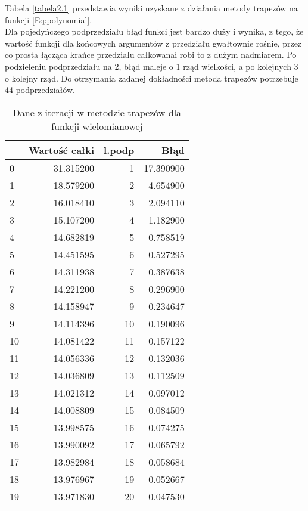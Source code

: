 \documentclass[12pt,twoside]{article}
\begin{document}
Tabela \eqref{tabela2.1} przedstawia wyniki uzyskane z działania metody trapezów na funkcji \eqref{Eq:polynomial}.\\
Dla pojedyńczego podprzedziału błąd funkci jest bardzo duży i wynika, z tego, że wartość funkcji dla końcowych argumentów z przedziału gwałtownie rośnie, przez co prosta łącząca krańce przedziału całkowanai robi to z dużym nadmiarem. Po podzieleniu podprzedziału na 2, błąd maleje o 1 rząd wielkości, a po kolejnych 3 o kolejny rząd. Do otrzymania zadanej dokładności metoda trapezów potrzebuje 44 podprzedziałów.
\begin{table}[ht]
\centering 
\caption{Dane z iteracji w metodzie trapezów dla funkcji wielomianowej}
\label{tabela2.1}
\begin{tabular}{lrrr}
\toprule
{} &  Wartość całki &  l.podp &       Błąd \\
\midrule
0  &      31.315200 &       1 &  17.390900 \\
1  &      18.579200 &       2 &   4.654900 \\
2  &      16.018410 &       3 &   2.094110 \\
3  &      15.107200 &       4 &   1.182900 \\
4  &      14.682819 &       5 &   0.758519 \\
5  &      14.451595 &       6 &   0.527295 \\
6  &      14.311938 &       7 &   0.387638 \\
7  &      14.221200 &       8 &   0.296900 \\
8  &      14.158947 &       9 &   0.234647 \\
9  &      14.114396 &      10 &   0.190096 \\
10 &      14.081422 &      11 &   0.157122 \\
11 &      14.056336 &      12 &   0.132036 \\
12 &      14.036809 &      13 &   0.112509 \\
13 &      14.021312 &      14 &   0.097012 \\
14 &      14.008809 &      15 &   0.084509 \\
15 &      13.998575 &      16 &   0.074275 \\
16 &      13.990092 &      17 &   0.065792 \\
17 &      13.982984 &      18 &   0.058684 \\
18 &      13.976967 &      19 &   0.052667 \\
19 &      13.971830 &      20 &   0.047530 \\

\end{tabular}
\end{table}
\end{document}
